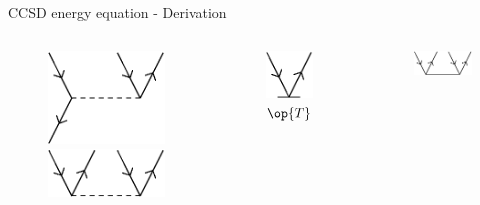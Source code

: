\begin{frame}{CCSD energy equation - Derivation }
\begin{columns}[t]
\begin{figure}
        \parbox{0.20\textwidth}{
            \centering
            \includegraphics[scale=0.35]{graphics/v8}} 
        \parbox{0.20\textwidth}{
            \centering
            \includegraphics[scale=0.35]{graphics/v9}} 
    \end{figure}
    \begin{figure}
        \caption{$\op{T}$}
        \centering
        \parbox[height=3cm]{0.60\textwidth}{
            \centering
            \includegraphics[scale=0.45]{graphics/t1}} 
    \end{figure}
    \begin{figure}
        \parbox[height=3cm]{0.60\textwidth}{
            \centering
            \includegraphics[scale=0.45]{graphics/t2}} 
    \end{figure}
\end{columns}


\end{frame}

